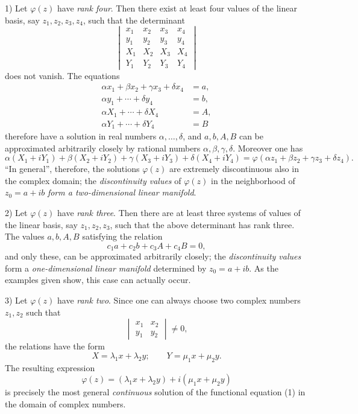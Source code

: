 \documentclass[11pt]{article}
\begin{document}
1) Let \(\varphi(z)\) have \emph{rank four}. Then there exist at least four values of the linear basis, say \(z_1,z_2,z_3,z_4\), such that the determinant
\[
\begin{vmatrix}
x_1&x_2&x_3&x_4\\
y_1&y_2&y_3&y_4\\
X_1&X_2&X_3&X_4\\
Y_1&Y_2&Y_3&Y_4
\end{vmatrix}
\]
does not vanish. The equations
\[
\begin{aligned}
\alpha x_1+\beta x_2+\gamma x_3+\delta x_4&=a,\\
\alpha y_1+\cdots+\delta y_4&=b,\\
\alpha X_1+\cdots+\delta X_4&=A,\\
\alpha Y_1+\cdots+\delta Y_4&=B
\end{aligned}
\]
therefore have a solution in real numbers \(\alpha,\ldots,\delta\), and \(a,b,A,B\) can be approximated arbitrarily closely by rational numbers \(\alpha,\beta,\gamma,\delta\). Moreover one has
\[
\alpha(X_1+iY_1)+\beta(X_2+iY_2)+\gamma(X_3+iY_3)+\delta(X_4+iY_4)
 =\varphi(\alpha z_1+\beta z_2+\gamma z_3+\delta z_4).
\]
``In general'', therefore, the solutions \(\varphi(z)\) are extremely discontinuous also in the complex domain; the \emph{discontinuity values} of \(\varphi(z)\) in the neighborhood of \(z_0=a+ib\) \emph{form a two-dimensional linear manifold}.

2) Let \(\varphi(z)\) have \emph{rank three}. Then there are at least three systems of values of the linear basis, say \(z_1,z_2,z_3\), such that the above determinant has rank three. The values \(a,b,A,B\) satisfying the relation
\[
c_1a+c_2b+c_3A+c_4B=0,
\]
and only these, can be approximated arbitrarily closely; the \emph{discontinuity values} form a \emph{one-dimensional linear manifold} determined by \(z_0=a+ib\). As the examples given show, this case can actually occur.

3) Let \(\varphi(z)\) have \emph{rank two}. Since one can always choose two complex numbers \(z_1,z_2\) such that
\[
\begin{vmatrix}x_1&x_2\\ y_1&y_2\end{vmatrix}\ne0,
\]
the relations have the form
\[
X=\lambda_1x+\lambda_2y;\qquad Y=\mu_1x+\mu_2y.
\]
The resulting expression
\[
\varphi(z)=(\lambda_1x+\lambda_2y)+i(\mu_1x+\mu_2y)
\]
is precisely the most general \emph{continuous} solution of the functional equation (1) in the domain of complex numbers.
\end{document}
